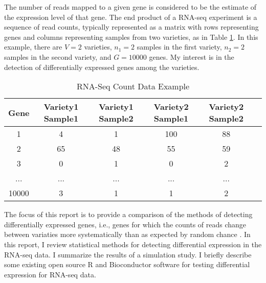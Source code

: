 The number of reads mapped to a given gene is considered to be the estimate of the expression level of that gene. The end product of a RNA-seq experiment is a sequence of read counts, typically represented as a matrix with rows representing genes and columns representing samples from two varieties, as in Table \ref{tab:RNA-Seq Data}. In this example, there are $V=2$ varieties, $n_1 = 2$ samples in the first variety, $n_2=2$ samples in the second variety, and $G=10000$ genes. My interest is in the detection of differentially expressed genes among the varieties. 

\begin{table}[H]
\begin{center}
    \begin{tabular}{|c|c|c|c|c|c|}
      \hline
      Gene &Variety1 Sample1 &Variety1 Sample2 &Variety2 Sample1 & Variety2 Sample2 \\
      \hline
      1 & 4 & 1 & 100 & 88 \\
      \hline
      2 & 65 & 48 & 55 & 59 \\
      \hline
      3 & 0 & 1 & 0 & 2\\
      \hline
      ... & ... & ... & ... & ...\\
      \hline
       10000 & 3 & 1 & 1 & 2\\
       \hline
    \end{tabular}
\end{center}
\caption{RNA-Seq Count Data Example}
\label{tab:RNA-Seq Data}
\end{table}

The focus of this report is to provide a comparison of the methods of detecting differentially expressed genes, i.e., genes for which the counts of reads change between variaties more systematically than as expected by random chance \citep{oshlack2010rna}. In this report, I review statistical methods for detecting differential expression in the RNA-seq data. I summarize the results of a simulation study. I briefly describe some existing open source R and Bioconductor software for testing differential expression for RNA-seq data.

